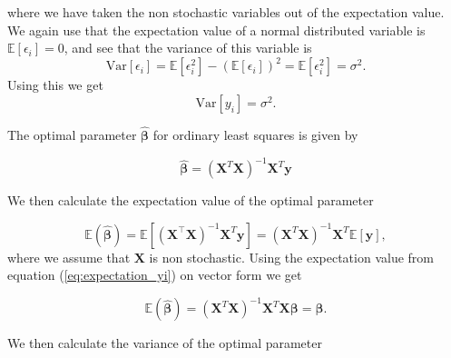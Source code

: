 where we have taken the non stochastic variables out of the expectation value. We again use that the expectation value of a normal distributed variable is $\mathbb{E}[\epsilon_i ]=0$, and see that the variance of this variable is
$$
\mbox{Var}[\epsilon_i]=\mathbb{E}[\epsilon_i^2 ]-(\mathbb{E}[\epsilon_i ])^2=\mathbb{E}[\epsilon_i^2 ]=\sigma^2.
$$
Using this we get
\begin{equation}\label{eq:var_yi}
\mbox{Var}[y_i] = \sigma^2.
\end{equation}



The optimal parameter $\hat{\boldsymbol{\beta}}$ for ordinary least squares is given by

$$
\hat{\boldsymbol\beta}=(\mathbf{X}^T\mathbf{X})^{-1}\mathbf{X}^T\mathbf{y}
$$


We then calculate the expectation value of the optimal parameter

$$
\mathbb{E}(\boldsymbol{\hat{\beta}}) = \mathbb{E}[ (\mathbf{X}^{\top} \mathbf{X})^{-1}\mathbf{X}^{T} \mathbf{y}]=(\mathbf{X}^{T} \mathbf{X})^{-1}\mathbf{X}^{T} \mathbb{E}[ \mathbf{y}],
$$
where we assume that $\mathbf{X}$ is non stochastic. Using the expectation value from equation (\ref{eq:expectation_yi}) on vector form we get

\begin{equation}\label{eq:expectation_beta_app}
\mathbb{E}(\boldsymbol{\hat{\beta}}) = (\mathbf{X}^{T} \mathbf{X})^{-1} \mathbf{X}^{T}\mathbf{X}\boldsymbol{\beta}=\boldsymbol{\beta}.
\end{equation}

We then calculate the variance of the optimal parameter

